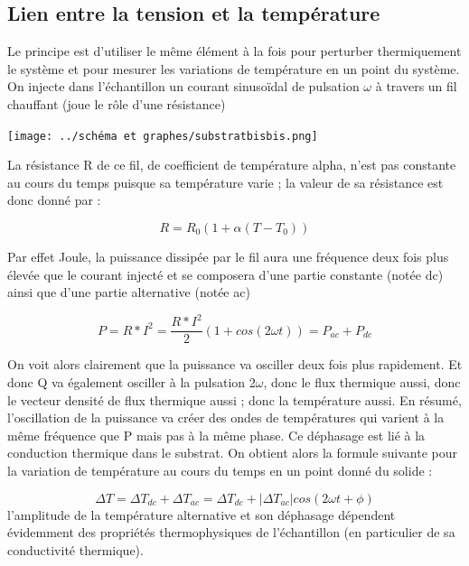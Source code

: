 \documentclass[10pt,a4paper]{report}
\begin{document}
\subsection{Lien entre la tension et la température}
Le principe est d’utiliser le même élément à la fois pour perturber thermiquement le système et pour mesurer les variations de température en un point du système. On injecte dans l’échantillon un courant sinusoïdal de pulsation $\omega$ à travers un fil chauffant (joue le rôle d’une résistance)
\begin{center}
\texttt{[image: ../schéma et graphes/substratbisbis.png]} 
\label{fig1}
\end{center}
La résistance R de ce fil, de coefficient de température alpha, n’est pas constante au cours du temps puisque sa température varie ; la valeur de sa résistance est donc donné par :
\begin{center}
\begin{equation}
R=R_{0}(1+\alpha(T-T_{0}))
\end{equation}
\end{center}
Par effet Joule, la puissance dissipée par le fil aura une fréquence deux fois plus élevée que le courant injecté et se composera d’une partie constante (notée dc) ainsi que d’une partie alternative (notée ac)
\begin{center}
\begin{equation}
P=R*I^2=\frac{R*I^2}{2}(1+cos(2\omega t))=P_{ac}+P_{dc}
\end{equation}
\end{center}
On voit alors clairement que la puissance va osciller deux fois plus rapidement. Et donc Q va également osciller à la pulsation 2$\omega$, donc le flux thermique aussi, donc le vecteur densité de flux thermique aussi ; donc la température aussi. En résumé, l’oscillation de la puissance va créer des ondes de températures qui varient à la même fréquence que P mais pas à la même phase. Ce déphasage est lié à la conduction thermique dans le substrat. On obtient alors la formule suivante pour la variation de température au cours du temps en un point donné du solide :
\begin{center}
\begin{equation}
\Delta T=\Delta T_{dc}+\Delta T_{ac}=\Delta T_{dc}+\lvert \Delta T_{ac} \rvert cos(2\omega t+\phi)
\end{equation}
l’amplitude de la température alternative et son déphasage dépendent évidemment des propriétés thermophysiques de l’échantillon (en particulier de sa conductivité thermique).
\end{center}
\end{document}

